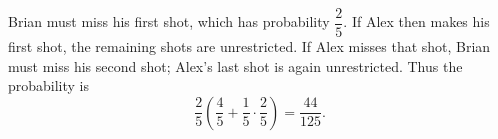 Brian must miss his first shot, which has probability $\dfrac{2}{5}$. If Alex then makes his first shot, the remaining shots are unrestricted. If Alex misses that shot, Brian must miss his second shot; Alex's last shot is again unrestricted. Thus the probability is
\[
\dfrac{2}{5}\left(\dfrac{4}{5}+\dfrac{1}{5}\cdot\dfrac{2}{5}\right)=\boxed{\dfrac{44}{125}}.
\]
